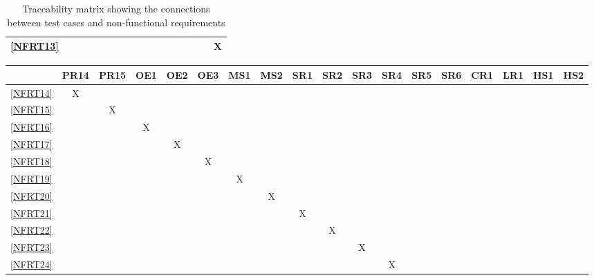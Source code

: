 \documentclass[12pt, titlepage]{article}
\begin{document}
\begin{landscape}
\begin{table}[h!]
\begin{tabular}{|c|c|c|c|c|c|c|c|c|c|c|c|c|c|c|c|c|}
      \ref{NFRT13} &     &     &     &     &     &     &     &     &     &     &     &     &      &      &      & X    \\ \hline
    \end{tabular}
    \caption{Traceability matrix showing the connections between test cases
      and non-functional requirements}
    \label{tab:nfrt1}
  \end{table}
  \begin{table}[h!]
    \centering
    \begin{tabular}{|c|c|c|c|c|c|c|c|c|c|c|c|c|c|c|c|c|c|} \hline
                & PR14 & PR15 & OE1 & OE2 & OE3 & MS1 & MS2 & SR1 & SR2 & SR3 & SR4 & SR5 & SR6 & CR1 & LR1 & HS1 & HS2 \\ \hline
      \ref{NFRT14} & X    &      &     &     &     &     &     &     &     &     &     &     &     &     &     &     &     \\ \hline
      \ref{NFRT15} &      & X    &     &     &     &     &     &     &     &     &     &     &     &     &     &     &     \\ \hline
      \ref{NFRT16} &      &      & X   &     &     &     &     &     &     &     &     &     &     &     &     &     &     \\ \hline
      \ref{NFRT17} &      &      &     & X   &     &     &     &     &     &     &     &     &     &     &     &     &     \\ \hline
      \ref{NFRT18} &      &      &     &     & X   &     &     &     &     &     &     &     &     &     &     &     &     \\ \hline
      \ref{NFRT19} &      &      &     &     &     & X   &     &     &     &     &     &     &     &     &     &     &     \\ \hline
      \ref{NFRT20} &      &      &     &     &     &     & X   &     &     &     &     &     &     &     &     &     &     \\ \hline
      \ref{NFRT21} &      &      &     &     &     &     &     & X   &     &     &     &     &     &     &     &     &     \\ \hline
      \ref{NFRT22} &      &      &     &     &     &     &     &     & X   &     &     &     &     &     &     &     &     \\ \hline
      \ref{NFRT23} &      &      &     &     &     &     &     &     &     & X   &     &     &     &     &     &     &     \\ \hline
      \ref{NFRT24} &      &      &     &     &     &     &     &     &     &     & X   &     &     &     &     &     &     \\ \hline

\end{tabular}
\end{table}
\end{landscape}
\end{document}
